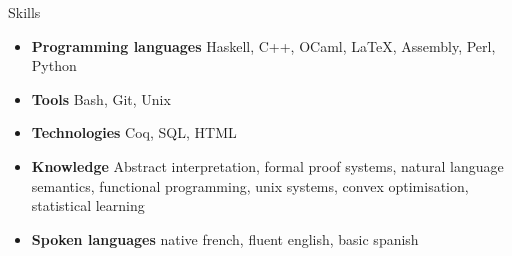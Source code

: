 \documentclass[a4paper,14pt]{extarticle}
\newcommand{\cvtitle}[1]{
    \begin{tcolorbox}[colback=bgcol,colframe=ForestGreen,
        height=1cm, valign=center, sharp corners=downhill]
        {\Large #1}
    \end{tcolorbox}
}
\begin{document}
\begin{minipage}[c][282mm][t]{0.60\linewidth}
        \cvtitle{Skills}

        \begin{itemize}
            \item \textbf{Programming languages} Haskell, C++, OCaml, \LaTeX, Assembly, Perl, Python
            \item \textbf{Tools} Bash, Git, Unix
            \item \textbf{Technologies} Coq, SQL, HTML
            \item \textbf{Knowledge} Abstract interpretation, formal proof systems, natural language semantics,
                functional programming, unix systems, convex optimisation, statistical learning
            \item \textbf{Spoken languages} native french, fluent english, basic spanish
        \end{itemize}

    \end{minipage}
\end{document}
